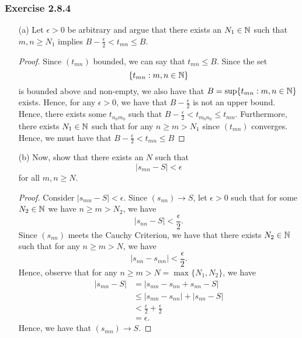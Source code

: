 \begin{enumerate}
        \subsubsection{Exercise 2.8.4}     
        \begin{enumerate}
            \item[(a)] Let \( \epsilon > 0  \) be arbitrary and argue that there exists an \(  N_1 \in \mathbb{N}  \) such that \( m,n \geq  N_1 \) implies \( B - \frac{ \epsilon  }{ 2 } < t_{mn} \leq  B.\)
                \begin{proof}
                    Since \( (t_{mn}) \) bounded, we can say that \( t_{mn} \leq B \). Since the set 
                    \[  \{ t_{mn} : m,n \in \mathbb{N} \}  \]
                    is bounded above and non-empty, we also have that 
                    \( B = \sup \{ t_{mn}: m,n \in \mathbb{N}  \}  \) exists. Hence, for any \( \epsilon > 0  \), we have that \( B - \frac{ \epsilon  }{ 2 }  \) is not an upper bound. Hence, there exists some \( t_{n_0 m_0} \) such that \( B - \frac{ \epsilon  }{ 2 } < t_{m_0 n_0} \leq t_{mn}\). Furthermore, there exists \( N_1 \in \mathbb{N}  \) such that for any \(  n \geq m > N_1  \) since \( (t_{mn}) \) converges. Hence,  we must have that 
                    \( B - \frac{ \epsilon  }{ 2 } < t_{mn} \leq B \)
                \end{proof}
            \item[(b)] Now, show that there exists an \( N  \) such that 
            \[ | s_{mn} - S  | < \epsilon \]
            for all \( m,n \geq N \).
            \begin{proof}
                Consider \(  | s_{mn} - S  | < \epsilon \). Since \(  (s_{nn}) \to S  \), let \( \epsilon > 0  \) such that for some \( N_2 \in \mathbb{N}  \) we have \( n \geq m > N_2  \), we have
                \[ | s_{nn} - S  | < \frac{ \epsilon  }{ 2 } . \]
                Since \( (s_{nn}) \) meets the Cauchy Criterion, we have that there exists \( N_2 \in \mathbb{N}  \) such that for any \( n \geq m > N  \), we have 
                \[ | s_{nn} - s_{mn} | < \frac{ \epsilon  }{ 2 }.   \]
                Hence, observe that for any \( n \geq m > N = \max \{ N_1, N_2 \}  \), we have
                \begin{align*}
                    | s_{mn} - S  | &= | s_{mn} - s_{nn} + s_{nn} - S  |  \\
                                    &\leq  | s_{mn} - s_{nn} | + | s_{nn} - S  | \\ 
                                    &< \frac{ \epsilon  }{ 2 } + \frac{ \epsilon  }{ 2 } \\
                                    &= \epsilon.
                \end{align*}
                Hence, we have that \( (s_{mn} ) \to S \). 
            \end{proof}
        \end{enumerate}


\end{enumerate}
